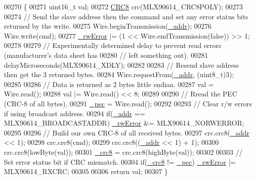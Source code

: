 \begin{DoxyCode}
00270                                      \{
00271     uint16\_t val;
00272     \mbox{\hyperlink{class_c_r_c8}{CRC8}} crc(MLX90614\_CRC8POLY);
00273 
00274     \textcolor{comment}{// Send the slave address then the command and set any error status bits returned by the write.}
00275     Wire.beginTransmission(\mbox{\hyperlink{class_m_l_x90614_a768925264f76f33f9bf98aec1cbec6a9}{\_addr}});
00276     Wire.write(cmd);
00277     \mbox{\hyperlink{class_m_l_x90614_a8c203cc9359c283d07682ba7dbcc5de3}{\_rwError}} |= (1 << Wire.endTransmission(\textcolor{keyword}{false})) >> 1;
00278 
00279     \textcolor{comment}{// Experimentally determined delay to prevent read errors (manufacturer's data sheet has }
00280     \textcolor{comment}{// left something out).}
00281     delayMicroseconds(MLX90614\_XDLY);
00282 
00283     \textcolor{comment}{// Resend slave address then get the 3 returned bytes.}
00284     Wire.requestFrom(\mbox{\hyperlink{class_m_l_x90614_a768925264f76f33f9bf98aec1cbec6a9}{\_addr}}, (uint8\_t)3);
00285 
00286     \textcolor{comment}{// Data is returned as 2 bytes little endian.}
00287     val = Wire.read();
00288     val |= Wire.read() << 8;
00289 
00290     \textcolor{comment}{// Rread the PEC (CRC-8 of all bytes).}
00291     \mbox{\hyperlink{class_m_l_x90614_a2526978eb988a8712baee6dca596be15}{\_pec}} = Wire.read();
00292 
00293     \textcolor{comment}{// Clear r/w errors if using broadcast address.}
00294     \textcolor{keywordflow}{if}(\mbox{\hyperlink{class_m_l_x90614_a768925264f76f33f9bf98aec1cbec6a9}{\_addr}} == MLX90614\_BROADCASTADDR) \mbox{\hyperlink{class_m_l_x90614_a8c203cc9359c283d07682ba7dbcc5de3}{\_rwError}} &= MLX90614\_NORWERROR;
00295     
00296     \textcolor{comment}{// Build our own CRC-8 of all received bytes.}
00297     crc.crc8(\mbox{\hyperlink{class_m_l_x90614_a768925264f76f33f9bf98aec1cbec6a9}{\_addr}} << 1);
00298     crc.crc8(cmd);
00299     crc.crc8((\mbox{\hyperlink{class_m_l_x90614_a768925264f76f33f9bf98aec1cbec6a9}{\_addr}} << 1) + 1);
00300     crc.crc8(lowByte(val));
00301     \mbox{\hyperlink{class_m_l_x90614_add210d34992507e8ccb753a040b14395}{\_crc8}} = crc.crc8(highByte(val));
00302 
00303     \textcolor{comment}{// Set error status bit if CRC mismatch.}
00304     \textcolor{keywordflow}{if}(\mbox{\hyperlink{class_m_l_x90614_add210d34992507e8ccb753a040b14395}{\_crc8}} != \mbox{\hyperlink{class_m_l_x90614_a2526978eb988a8712baee6dca596be15}{\_pec}}) \mbox{\hyperlink{class_m_l_x90614_a8c203cc9359c283d07682ba7dbcc5de3}{\_rwError}} |= MLX90614\_RXCRC;
00305 
00306     \textcolor{keywordflow}{return} val;
00307 \}
\end{DoxyCode}
